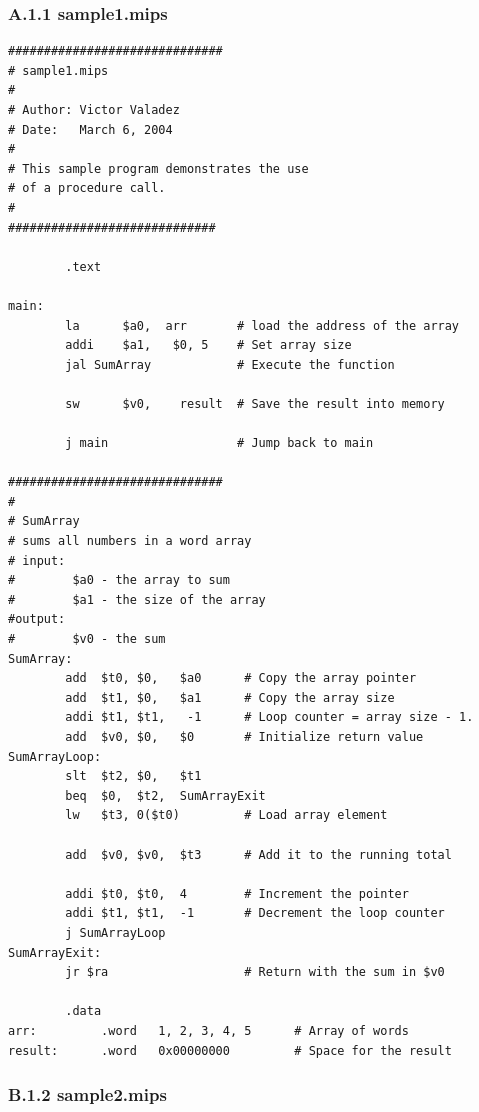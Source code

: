 \documentclass[]{spie}
\begin{document}
\subsubsection*{A.1.1 sample1.mips}
\begin{center}
\begin{verbatim}
##############################
# sample1.mips
#
# Author: Victor Valadez
# Date:   March 6, 2004
# 
# This sample program demonstrates the use
# of a procedure call.
# 
#############################

        .text   

main:   
        la      $a0,  arr       # load the address of the array
        addi    $a1,   $0, 5    # Set array size
        jal SumArray            # Execute the function
                        
        sw      $v0,    result  # Save the result into memory
        
        j main                  # Jump back to main

##############################
#
# SumArray
# sums all numbers in a word array
# input: 
#        $a0 - the array to sum
#        $a1 - the size of the array
#output:
#        $v0 - the sum
SumArray:
        add  $t0, $0,   $a0      # Copy the array pointer
        add  $t1, $0,   $a1      # Copy the array size
        addi $t1, $t1,   -1      # Loop counter = array size - 1.
        add  $v0, $0,   $0       # Initialize return value
SumArrayLoop:   
        slt  $t2, $0,   $t1        
        beq  $0,  $t2,  SumArrayExit
        lw   $t3, 0($t0)         # Load array element
        
        add  $v0, $v0,  $t3      # Add it to the running total
        
        addi $t0, $t0,  4        # Increment the pointer
        addi $t1, $t1,  -1       # Decrement the loop counter
        j SumArrayLoop
SumArrayExit:   
        jr $ra                   # Return with the sum in $v0
        
        .data 
arr:         .word   1, 2, 3, 4, 5      # Array of words
result:      .word   0x00000000         # Space for the result
\end{verbatim}
\end{center}


\subsubsection*{B.1.2 sample2.mips}
\end{document}

